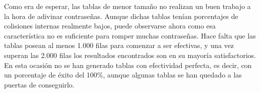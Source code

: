 \documentclass[12pt,spanish,listoffigures,listoftables,listofalgorithms]{tfgetsinf}
\begin{document}
\def\arraystretch{1.5}
\begin{table}[H]
	\centering
	\caption{Porcentajes de éxito para las tablas que emplean \textbf{R1}}
	\label{exR1}
\end{table}

Como era de esperar, las tablas de menor tamaño no realizan un buen trabajo a la hora de adivinar contraseñas. Aunque dichas tablas tenían porcentajes de colisiones internas realmente bajos, puede observarse ahora como esa característica no es suficiente para romper muchas contraseñas. Hace falta que las tablas posean al menos 1.000 filas para comenzar a ser efectivas, y una vez superan las 2.000 filas los resultados encontrados son en su mayoría satisfactorios. En esta ocasión no se han generado tablas con efectividad perfecta, es decir, con un porcentaje de éxito del 100\%, aunque algunas tablas se han quedado a las puertas de conseguirlo.
\end{document}
